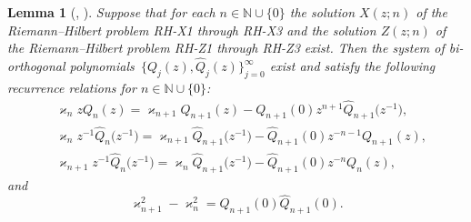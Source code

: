 \documentclass[pdftex]{sigma}
\numberwithin{equation}{section}
\newtheorem{Lemma}[Theorem]{Lemma}
 { \theoremstyle{definition}
\newtheorem{Definition}[Theorem]{Definition}
\newtheorem{Example}[Theorem]{Example}
\newtheorem{Remark}[Theorem]{Remark}
\newtheorem{Question}[Theorem]{Question}
}
\newcommand{\N}{{\mathbb N}}
\begin{document}
\begin{Lemma}[{\cite[Lemma 2.2]{DIK}, \cite{SzegoOP}}]\label{lemma 3term} Suppose that for each $n \!\in \N \cup \{0\}$ the solution $X(z;n)$ of the Riemann--Hilbert problem {\rm RH-X1} through {\rm RH-X3} and the solution $Z(z;n)$ of the Rie\-mann--Hilbert problem {\rm RH-Z1} through {\rm RH-Z3} exist. Then the system of bi-orthogonal poly\-no\-mi\-als~${\big\{Q_j(z),\widehat{Q}_j(z)\big\}^{\infty}_{j=0}}$ exist and satisfy the following recurrence relations for $n \in \N \cup \{0\}$:
			\begin{align}
				&	\varkappa_n z Q_n(z) = \varkappa_{n+1} Q_{n+1}(z) - Q_{n+1}(0) z^{n+1} \widehat{Q}_{n+1}\big(z^{-1}\big), \label{2.3 DIK} \\
				&	\varkappa_n z^{-1} \widehat{Q}_{n}\big(z^{-1}\big) = \varkappa_{n+1} \widehat{Q}_{n+1}\big(z^{-1}\big) - \widehat{Q}_{n+1}(0) z^{-n-1}Q_{n+1}(z), \label{2.4 DIK}\\
				&	\varkappa_{n+1} z^{-1} \widehat{Q}_{n}\big(z^{-1}\big) = \varkappa_{n} \widehat{Q}_{n+1}\big(z^{-1}\big) - \widehat{Q}_{n+1}(0) z^{-n}Q_{n}(z), \label{2.5 DIK}
			\end{align}
			and
			\begin{equation}
				\varkappa^2_{n+1} - \varkappa^2_{n} = Q_{n+1}(0) \widehat{Q}_{n+1}(0). \label{2.6 DIK}
			\end{equation}
		\end{Lemma}
		
\end{document}
